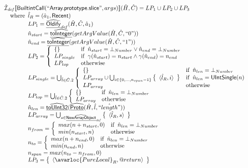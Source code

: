 \[
\begin{array}{l}

\aI_{\it def}\lbr \SF{BuiltintCall}(``\SF{Array.prototype.slice}",args)\rbr(\hat{H},\hat{C}) = LP_1 \cup LP_2 \cup LP_3\\
\quad\wherec{
  \hat{l}_R = (\hat{a}_1, \SF{Recent})\\
  LP_1 = \ahf{Oldify}_{\it def}(\hat{H},\hat{C}, \hat{a}_1)\\
  \hat{n}_{start} = \ahf{toInteger}(getArgValue(\hat{H},\hat{C}, ``0"))\\
  \hat{n}_{end} = \ahf{toInteger}(getArgValue(\hat{H},\hat{C}, ``1"))\\
  LP_2 = \left\{\begin{array}{ll}
      \set{} & \ifc{\hat{n}_{start} = \bot_{Number} \lor \hat{n}_{end} = \bot_{Number}}\\
      LP_{single} & \ifc{\gamma(\hat{n}_{start}) = n_{start} \land \gamma(\hat{n}_{end}) = n_{end} }\\
      LP_{top} & \owc
    \end{array}\right.\\
  LP_{single} = \bigcup_{\hat{l} \in \hat{C}.2} \left\{\begin{array}{ll}
      \set{} & \ifc{\hat{n}_{len} = \bot_{Number}}\\
      LP_{array} \cup \bigcup_{i \in \{0,...,n_{span}-1\}} \set{\langle \hat{l}_R, i\rangle}
      & \ifc{\hat{n}_{len} = \SF{UIntSingle}(n)}\\
      LP_{array} & \owc
    \end{array}\right.\\
  LP_{top} = \bigcup_{\hat{l} \in \hat{C}.2} \left\{\begin{array}{ll}
      \set{} & \ifc{\hat{n}_{len} = \bot_{Number}}\\
      LP_{array} & \owc
    \end{array}\right.\\
  \hat{n}_{len} = \ahf{toUInt32}(\ahf{Proto}(\hat{H}, \hat{l}, \hat{``length"}))\\
  LP_{array} = \bigcup_{s \in \ahf{NewArrayObject}_{\it def}} \set{\langle \hat{l}_R,s\rangle}\\
  n_{from} = \left\{\begin{array}{ll}
      max(n + n_{start}, 0) & \ifc{\hat{n}_{len} = \bot_{Number}}\\
      min(n_{start}, n) & \owc
    \end{array}\right.\\
  n_{to} = \left\{\begin{array}{ll}
      max(n + n_{end}, 0) & \ifc{\hat{n}_{len} = \bot_{Number}}\\
      min(n_{end}, n) & \owc
    \end{array}\right.\\
  n_{span} = max(n_{to}-n_{from}, 0)\\
  LP_3 = \set{\langle\avarloc{PureLocal}_R,\varprop{return}\rangle}\\
  }\\
\\




\end{array}\]
